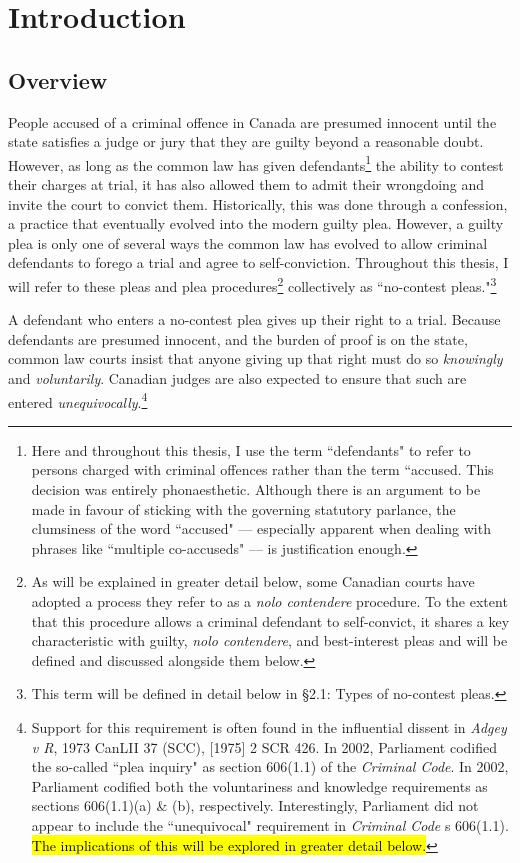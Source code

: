 \chapter{Introduction}

\section{Overview}

People accused of a criminal offence in Canada are presumed innocent until the state satisfies a judge or jury that they are guilty beyond a reasonable doubt. However, as long as the common law has given defendants\footnote{Here and throughout this thesis, I use the term ``defendants" to refer to persons charged with criminal offences rather than the term ``accused. This decision was entirely phonaesthetic. Although there is an argument to be made in favour of sticking with the governing statutory parlance, the clumsiness of the word ``accused" — especially apparent when dealing with phrases like ``multiple co-accuseds" — is justification enough.} the ability to contest their charges at trial, it has also allowed them to admit their wrongdoing and invite the court to convict them. Historically, this was done through a confession, a practice that eventually evolved into the modern guilty plea. However, a guilty plea is only one of several ways the common law has evolved to allow criminal defendants to forego a trial and agree to self-conviction. Throughout this thesis, I will refer to these pleas and plea procedures\footnote{As will be explained in greater detail below, some Canadian courts have adopted a process they refer to as a \textit{nolo contendere} procedure. To the extent that this procedure allows a criminal defendant to self-convict, it shares a key characteristic with guilty, \textit{nolo contendere}, and best-interest pleas and will be defined and discussed alongside them below.} collectively as ``no-contest pleas."\footnote{This term will be defined in detail below in §2.1: Types of no-contest pleas.} 

A defendant who enters a no-contest plea gives up their right to a trial. Because defendants are presumed innocent, and the burden of proof is on the state, common law courts insist that anyone giving up that right must do so \textit{knowingly} and \textit{voluntarily}. Canadian judges are also expected to ensure that such are entered \textit{unequivocally}.\footnote{Support for this requirement is often found in the influential dissent in \textit{Adgey v R}, 1973 CanLII 37 (SCC), [1975] 2 SCR 426. In 2002, Parliament codified the so-called ``plea inquiry" as section 606(1.1) of the \textit{Criminal Code}. In 2002, Parliament codified both the voluntariness and knowledge requirements as sections 606(1.1)(a) \& (b), respectively. Interestingly, Parliament did not appear to include the ``unequivocal" requirement in \textit{Criminal Code} s 606(1.1). \hl{The implications of this will be explored in greater detail below.}}

